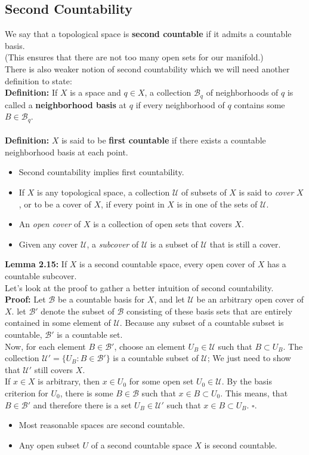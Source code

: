\documentclass{article}
\begin{document}
\subsection{Second Countability}
We say that a topological space is \textbf{second countable} if it admits a countable basis.\\
(This ensures that there are not too many open sets for our manifold.)\\
There is also weaker notion of second countability which we will need another definition to state:\\
\textbf{Definition:} If $X$ is a space and $q\in X$, a collection $\mathcal{B}_q$ of neighborhoods of $q$ is called a \textbf{neighborhood basis} at $q$ if every neighborhood of $q$ contains some $B\in\mathcal{B}_q$.\\
\\
\textbf{Definition:} $X$ is said to be \textbf{first countable} if there exists a countable neighborhood basis at each point.
\begin{itemize}
    \item Second countability implies first countability.
    \item If $X$ is any topological space, a collection $\mathcal{U}$ of subsets of $X$ is said to \textit{cover} $X$, or to be a cover of $X$, if every point in $X$ is in one of the sets of $\mathcal{U}$.
    \item An \textit{open cover} of $X$ is a collection of open sets that covers $X$.
    \item Given any cover $\mathcal{U}$, a \textit{subcover} of $\mathcal{U}$ is a subset of $\mathcal{U}$ that is still a cover.
\end{itemize}
\textbf{Lemma 2.15:} If $X$ is a second countable space, every open cover of $X$ has a countable subcover.\\
Let's look at the proof to gather a better intuition of second countability.\\
\textbf{Proof:} Let $\mathcal{B}$ be a countable basis for $X$, and let $\mathcal{U}$ be an arbitrary open cover of $X$. let $\mathcal{B}'$ denote the subset of $\mathcal{B}$ consisting of these basis sets that are entirely contained in some element of $\mathcal{U}$. Because any subset of a countable subset is countable, $\mathcal{B}'$ is a countable set.\\
Now, for each element $B\in\mathcal{B}'$, choose an element $U_B\in \mathcal{U}$ such that $B\subset U_B$. The collection $\mathcal{U}'=\{U_B:B\in\mathcal{B}'\}$ is a countable subset of $\mathcal{U}$; We just need to show that $\mathcal{U}'$ still covers $X$.\\
If $x\in X$ is arbitrary, then $x\in U_0$ for some open set $U_0\in\mathcal{U}$. By the basis criterion for $U_0$, there is some $B\in\mathcal{B}$ such that $x\in B\subset U_0$. This means, that $B\in \mathcal{B}'$ and therefore there is a set $U_B\in \mathcal{U}'$ such that $x\in B\subset U_B$. $\square$.
\begin{itemize}
    \item Most reasonable spaces are second countable.
    \item Any open subset $U$ of a second countable space $X$ is second countable.
\end{itemize}
\end{document}
